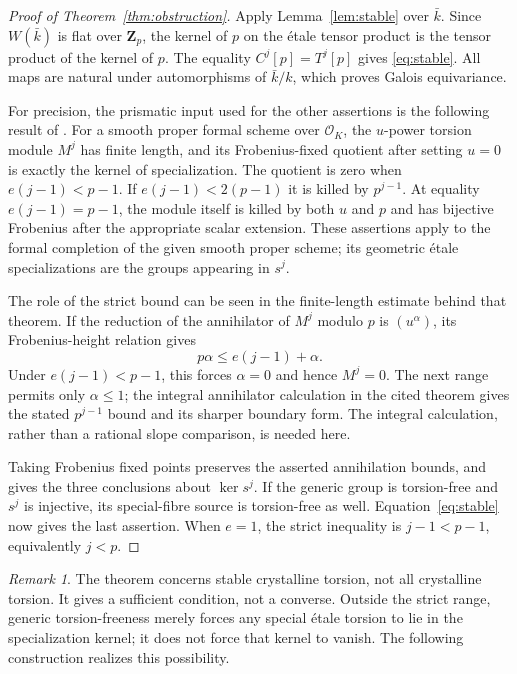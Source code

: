 \documentclass[11pt]{article}
\newcommand{\OO}{\mathcal O}\newcommand{\ZZ}{\mathbf Z}
\theoremstyle{definition}\newtheorem{definition}[theorem]{Definition}
\theoremstyle{remark}\newtheorem{remark}[theorem]{Remark}
\begin{document}
\begin{proof}[Proof of Theorem~\ref{thm:obstruction}]
Apply Lemma~\ref{lem:stable} over $\bar k$. Since $W(\bar k)$ is flat over $\ZZ_p$, the kernel of $p$ on the \'etale tensor product is the tensor product of the kernel of $p$. The equality $C^j[p]=T^j[p]$ gives \eqref{eq:stable}. All maps are natural under automorphisms of $\bar k/k$, which proves Galois equivariance.

For precision, the prismatic input used for the other assertions is the following result of \citet[Theorems~3.3 and~4.14, Corollary~4.15, author-version pp.~15--16 and~27--28]{LiLiu}. For a smooth proper formal scheme over $\OO_K$, the $u$-power torsion module $M^j$ has finite length, and its Frobenius-fixed quotient after setting $u=0$ is exactly the kernel of specialization. The quotient is zero when $e(j-1)<p-1$. If $e(j-1)<2(p-1)$ it is killed by $p^{j-1}$. At equality $e(j-1)=p-1$, the module itself is killed by both $u$ and $p$ and has bijective Frobenius after the appropriate scalar extension. These assertions apply to the formal completion of the given smooth proper scheme; its geometric \'etale specializations are the groups appearing in $s^j$.

The role of the strict bound can be seen in the finite-length estimate behind that theorem. If the reduction of the annihilator of $M^j$ modulo $p$ is $(u^\alpha)$, its Frobenius-height relation gives
\[
 p\alpha\leq e(j-1)+\alpha.
\]
Under $e(j-1)<p-1$, this forces $\alpha=0$ and hence $M^j=0$. The next range permits only $\alpha\leq1$; the integral annihilator calculation in the cited theorem gives the stated $p^{j-1}$ bound and its sharper boundary form. The integral calculation, rather than a rational slope comparison, is needed here.

Taking Frobenius fixed points preserves the asserted annihilation bounds, and gives the three conclusions about $\ker s^j$. If the generic group is torsion-free and $s^j$ is injective, its special-fibre source is torsion-free as well. Equation~\eqref{eq:stable} now gives the last assertion. When $e=1$, the strict inequality is $j-1<p-1$, equivalently $j<p$.
\end{proof}

\begin{remark}\label{rem:scope}
The theorem concerns stable crystalline torsion, not all crystalline torsion. It gives a sufficient condition, not a converse. Outside the strict range, generic torsion-freeness merely forces any special \'etale torsion to lie in the specialization kernel; it does not force that kernel to vanish. The following construction realizes this possibility.
\end{remark}
\end{document}
